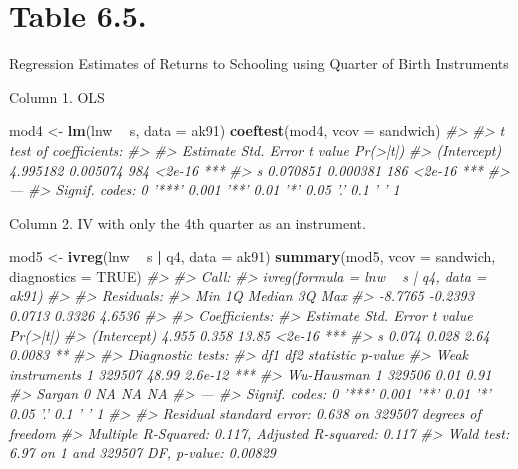 \documentclass[]{book}
\newenvironment{Shaded}{\begin{snugshade}}{\end{snugshade}}
\newcommand{\KeywordTok}[1]{\textcolor[rgb]{0.13,0.29,0.53}{\textbf{#1}}}
\newcommand{\DataTypeTok}[1]{\textcolor[rgb]{0.13,0.29,0.53}{#1}}
\newcommand{\StringTok}[1]{\textcolor[rgb]{0.31,0.60,0.02}{#1}}
\newcommand{\CommentTok}[1]{\textcolor[rgb]{0.56,0.35,0.01}{\textit{#1}}}
\newcommand{\OtherTok}[1]{\textcolor[rgb]{0.56,0.35,0.01}{#1}}
\newcommand{\OperatorTok}[1]{\textcolor[rgb]{0.81,0.36,0.00}{\textbf{#1}}}
\newcommand{\NormalTok}[1]{#1}
\theoremstyle{definition}
\theoremstyle{definition}
\theoremstyle{definition}
\theoremstyle{remark}
\begin{document}
\section{Table 6.5.}\label{table-6.5.}

Regression Estimates of Returns to Schooling using Quarter of Birth
Instruments

Column 1. OLS

\begin{Shaded}
\begin{Highlighting}[]
\NormalTok{mod4 <-}\StringTok{ }\KeywordTok{lm}\NormalTok{(lnw }\OperatorTok{~}\StringTok{ }\NormalTok{s, }\DataTypeTok{data =}\NormalTok{ ak91)}
\KeywordTok{coeftest}\NormalTok{(mod4, }\DataTypeTok{vcov =}\NormalTok{ sandwich)}
\CommentTok{#> }
\CommentTok{#> t test of coefficients:}
\CommentTok{#> }
\CommentTok{#>             Estimate Std. Error t value Pr(>|t|)    }
\CommentTok{#> (Intercept) 4.995182   0.005074     984   <2e-16 ***}
\CommentTok{#> s           0.070851   0.000381     186   <2e-16 ***}
\CommentTok{#> ---}
\CommentTok{#> Signif. codes:  0 '***' 0.001 '**' 0.01 '*' 0.05 '.' 0.1 ' ' 1}
\end{Highlighting}
\end{Shaded}

Column 2. IV with only the 4th quarter as an instrument.

\begin{Shaded}
\begin{Highlighting}[]
\NormalTok{mod5 <-}\StringTok{ }\KeywordTok{ivreg}\NormalTok{(lnw }\OperatorTok{~}\StringTok{ }\NormalTok{s }\OperatorTok{|}\StringTok{ }\NormalTok{q4, }\DataTypeTok{data =}\NormalTok{ ak91)}
\KeywordTok{summary}\NormalTok{(mod5, }\DataTypeTok{vcov =}\NormalTok{ sandwich, }\DataTypeTok{diagnostics =} \OtherTok{TRUE}\NormalTok{)}
\CommentTok{#> }
\CommentTok{#> Call:}
\CommentTok{#> ivreg(formula = lnw ~ s | q4, data = ak91)}
\CommentTok{#> }
\CommentTok{#> Residuals:}
\CommentTok{#>     Min      1Q  Median      3Q     Max }
\CommentTok{#> -8.7765 -0.2393  0.0713  0.3326  4.6536 }
\CommentTok{#> }
\CommentTok{#> Coefficients:}
\CommentTok{#>             Estimate Std. Error t value Pr(>|t|)    }
\CommentTok{#> (Intercept)    4.955      0.358   13.85   <2e-16 ***}
\CommentTok{#> s              0.074      0.028    2.64   0.0083 ** }
\CommentTok{#> }
\CommentTok{#> Diagnostic tests:}
\CommentTok{#>                     df1    df2 statistic p-value    }
\CommentTok{#> Weak instruments      1 329507     48.99 2.6e-12 ***}
\CommentTok{#> Wu-Hausman            1 329506      0.01    0.91    }
\CommentTok{#> Sargan                0     NA        NA      NA    }
\CommentTok{#> ---}
\CommentTok{#> Signif. codes:  0 '***' 0.001 '**' 0.01 '*' 0.05 '.' 0.1 ' ' 1}
\CommentTok{#> }
\CommentTok{#> Residual standard error: 0.638 on 329507 degrees of freedom}
\CommentTok{#> Multiple R-Squared: 0.117,   Adjusted R-squared: 0.117 }
\CommentTok{#> Wald test: 6.97 on 1 and 329507 DF,  p-value: 0.00829}
\end{Highlighting}
\end{Shaded}
\end{document}
